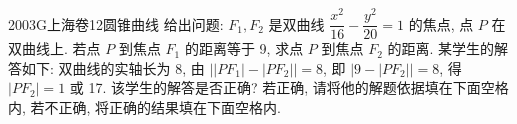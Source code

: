 
\begin{problem}{2003}{G}{上海卷}{12}{圆锥曲线}
给出问题: $F_1, F_2$ 是双曲线 $\dfrac{x^2}{16}-\dfrac{y^2}{20}=1$ 的焦点, 点 $P$ 在双曲线上. 若点 $P$ 到焦点 $F_1$ 的距离等于 9, 求点 $P$ 到焦点 $F_2$ 的距离. 某学生的解答如下: 双曲线的实轴长为 8, 由 $\left||PF_1|-|PF_2|\right|=8$, 即 $|9-|PF_2||=8$, 得 $|PF_2|=1$ 或 17. 该学生的解答是否正确? 若正确, 请将他的解题依据填在下面空格内, 若不正确, 将正确的结果填在下面空格内.
\underline{\hspace{1cm}}
\end{problem}
